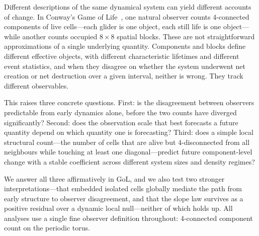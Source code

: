 \documentclass[aip,cha,preprint,nofootinbib]{revtex4-2}
\begin{document}
Different descriptions of the same dynamical system can yield different
accounts of change.
In Conway's Game of Life~\citep{gardner1970,wolfram1984}, one natural observer
counts 4-connected components of live cells---each glider is one object, each
still life is one object---while another counts occupied $8\times8$ spatial
blocks.
These are not straightforward approximations of a single underlying quantity.
Components and blocks define different effective objects, with different
characteristic lifetimes and different event statistics, and when they
disagree on whether the system underwent net creation or net destruction
over a given interval, neither is wrong.
They track different observables.

This raises three concrete questions.
First: is the disagreement between observers predictable from early dynamics
alone, before the two counts have diverged significantly?
Second: does the observation scale that best forecasts a future quantity
depend on which quantity one is forecasting?
Third: does a simple local structural count---the number of cells that are
alive but 4-disconnected from all neighbours while touching at least one
diagonal---predict future component-level change with a stable coefficient
across different system sizes and density regimes?

We answer all three affirmatively in GoL, and we also test two stronger
interpretations---that embedded isolated cells globally mediate the path from
early structure to observer disagreement, and that the slope law survives as a
positive residual over a dynamic local null---neither of which holds up.
All analyses use a single fine observer definition throughout: 4-connected
component count on the periodic torus.
\end{document}
